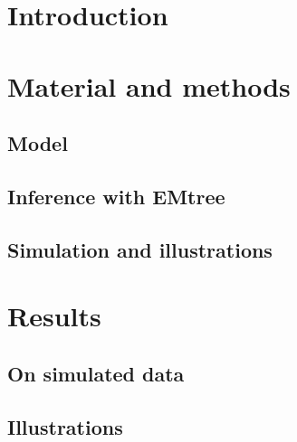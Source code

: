 \section{Introduction}

%

\section{Material and methods}
\subsection{Model} \label{sec:model} 
\subsection{Inference with EMtree} \label{sec:inference} 
\subsection{Simulation and illustrations} 
 
\section{Results}
\subsection{On simulated data}  \label{sec:simul}
\subsection{Illustrations}  \label{sec:illustration}

